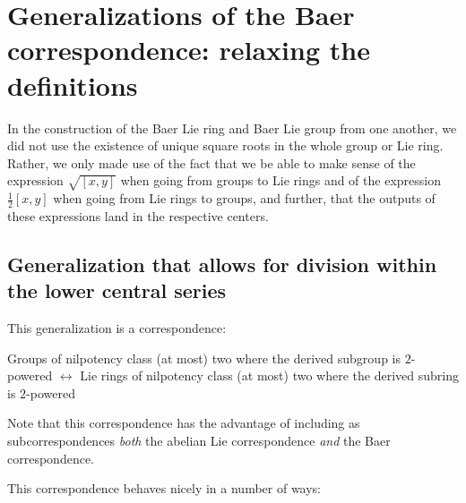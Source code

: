 \section{Generalizations of the Baer correspondence: relaxing the definitions}\label{sec:baer-correspondence-definition-relaxation}

In the construction of the Baer Lie ring and Baer Lie group from one
another, we did not use the existence of unique square roots in the
whole group or Lie ring. Rather, we only made use of the fact that we
be able to make sense of the expression $\sqrt{[x,y]}$ when going from
groups to Lie rings and of the expression $\frac{1}{2}[x,y]$ when
going from Lie rings to groups, and further, that the outputs of these
expressions land in the respective centers.

\subsection{Generalization that allows for division within the lower central series}\label{sec:baer-correspondence-lcs-generalization}

This generalization is a correspondence:

Groups of nilpotency class (at most) two where the derived subgroup is
$2$-powered $\leftrightarrow$ Lie rings of nilpotency class (at most)
two where the derived subring is $2$-powered

Note that this correspondence has the advantage of including as
subcorrespondences {\em both} the abelian Lie correspondence {\em and}
the Baer correspondence.

This correspondence behaves nicely in a number of ways:


